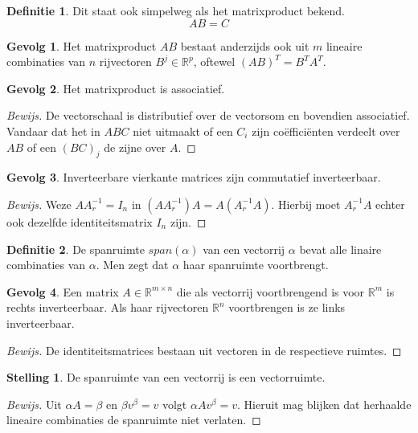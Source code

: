 \documentclass{amsart}
\theoremstyle{definition}
\newtheorem{thm}{Stelling}[section]
\newtheorem{dfn}{Definitie}[section]
\newtheorem{csq}{Gevolg}[section]
\newenvironment{bewijs}{\begin{proof}[Bewijs]}{\end{proof}}
\newcommand{\realnums}{\mathbb{R}}
\newcommand{\realn}[1][n]{\realnums^{#1}}
\newcommand{\realmx}[2][n]{\realn[#2 \times #1]}
\newcommand{\realmxn}{\realmx{m}}
\begin{document}
\begin{dfn}
	Dit staat ook simpelweg als het matrixproduct bekend.
	\begin{equation*}
		AB = C
	\end{equation*}
\end{dfn}

\begin{csq}
	Het matrixproduct $AB$ bestaat anderzijds ook uit $m$ lineaire combinaties van $n$ rijvectoren $B^j \in \realn[p]$, oftewel $(AB)^T = B^TA^T$.
\end{csq}

\begin{csq}
	Het matrixproduct is associatief.
	\begin{bewijs}
		De vectorschaal is distributief over de vectorsom en bovendien associatief.
		Vandaar dat het in $ABC$ niet uitmaakt of een $C_i$ zijn coëfficiënten verdeelt over $AB$ of een $(BC)_j$ de zijne over $A$.
	\end{bewijs}
\end{csq}

\begin{csq}
	Inverteerbare vierkante matrices zijn commutatief inverteerbaar.
	\begin{bewijs}
		Weze $AA^{-1}_r = I_n$ in $(AA^{-1}_r)A = A(A^{-1}_rA)$. Hierbij moet $A^{-1}_rA$ echter ook dezelfde identiteitsmatrix $I_n$ zijn.
	\end{bewijs}
\end{csq}

\begin{dfn}
	De spanruimte $span(\alpha)$ van een vectorrij $\alpha$ bevat alle linaire combinaties van $\alpha$.
	Men zegt dat $\alpha$ haar spanruimte voortbrengt.
\end{dfn}

\begin{csq}
	Een matrix $A \in \realmxn$ die als vectorrij voortbrengend is voor $\realn[m]$ is rechts inverteerbaar.
	Als haar rijvectoren $\realn$ voortbrengen is ze links inverteerbaar.
	\begin{bewijs}
		De identiteitsmatrices bestaan uit vectoren in de respectieve ruimtes.
	\end{bewijs}
\end{csq}

\begin{thm}
	De spanruimte van een vectorrij is een vectorruimte.
	\begin{bewijs}
		Uit $\alpha A = \beta$ en $\beta v^\beta = v$ volgt $\alpha A v^\beta = v$.
		Hieruit mag blijken dat herhaalde lineaire combinaties de spanruimte niet verlaten.
	\end{bewijs}
\end{thm}
\end{document}
